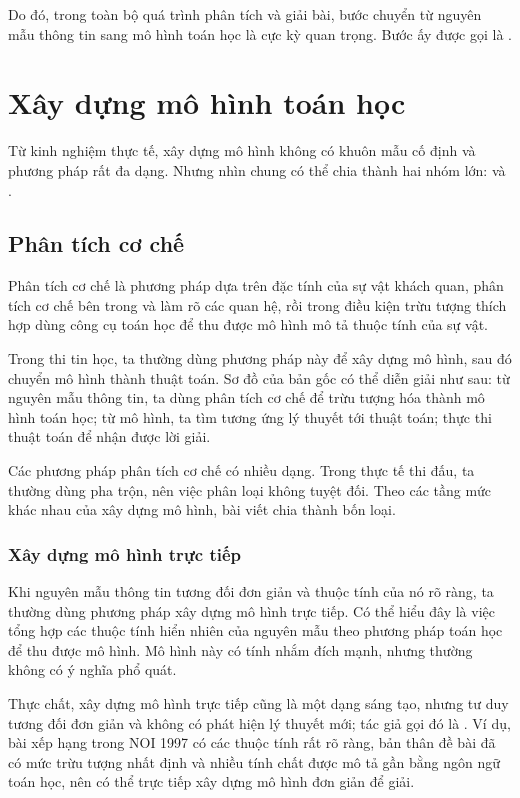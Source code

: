 \documentclass[11pt]{article}
\begin{document}
Do đó, trong toàn bộ quá trình phân tích và giải bài, bước chuyển từ nguyên
mẫu thông tin sang mô hình toán học là cực kỳ quan trọng. Bước ấy được gọi là
.

\section{Xây dựng mô hình toán học}

Từ kinh nghiệm thực tế, xây dựng mô hình không có khuôn mẫu cố định và phương
pháp rất đa dạng. Nhưng nhìn chung có thể chia thành hai nhóm lớn:
 và .

\subsection{Phân tích cơ chế}

Phân tích cơ chế là phương pháp dựa trên đặc tính của sự vật khách quan, phân
tích cơ chế bên trong và làm rõ các quan hệ, rồi trong điều kiện trừu tượng
thích hợp dùng công cụ toán học để thu được mô hình mô tả thuộc tính của sự
vật.

Trong thi tin học, ta thường dùng phương pháp này để xây dựng mô hình, sau đó
chuyển mô hình thành thuật toán. Sơ đồ của bản gốc có thể diễn giải như sau:
từ nguyên mẫu thông tin, ta dùng phân tích cơ chế để trừu tượng hóa thành mô
hình toán học; từ mô hình, ta tìm tương ứng lý thuyết tới thuật toán; thực thi
thuật toán để nhận được lời giải.

Các phương pháp phân tích cơ chế có nhiều dạng. Trong thực tế thi đấu, ta
thường dùng pha trộn, nên việc phân loại không tuyệt đối. Theo các tầng mức
khác nhau của xây dựng mô hình, bài viết chia thành bốn loại.

\subsubsection{Xây dựng mô hình trực tiếp}

Khi nguyên mẫu thông tin tương đối đơn giản và thuộc tính của nó rõ ràng, ta
thường dùng phương pháp xây dựng mô hình trực tiếp. Có thể hiểu đây là việc
tổng hợp các thuộc tính hiển nhiên của nguyên mẫu theo phương pháp toán học để
thu được mô hình. Mô hình này có tính nhắm đích mạnh, nhưng thường không có ý
nghĩa phổ quát.

Thực chất, xây dựng mô hình trực tiếp cũng là một dạng sáng tạo, nhưng tư duy
tương đối đơn giản và không có phát hiện lý thuyết mới; tác giả gọi đó là
. Ví dụ, bài xếp hạng trong NOI 1997 có các thuộc tính
rất rõ ràng, bản thân đề bài đã có mức trừu tượng nhất định và nhiều tính chất
được mô tả gần bằng ngôn ngữ toán học, nên có thể trực tiếp xây dựng mô hình
đơn giản để giải.
\end{document}
